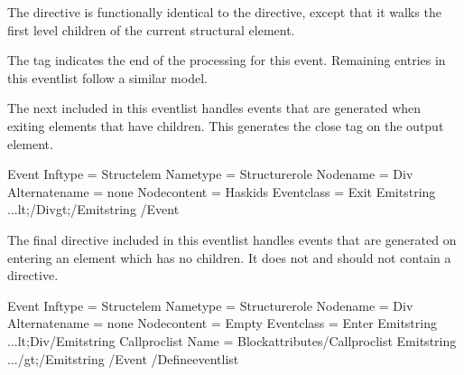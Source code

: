 \documentclass[letterpaper,12pt,english,openany,oneside]{sphinxmanual}
\begin{document}
The  directive is functionally identical to the  directive, except that it walks the first level children of the current structural element.

The  tag indicates the end of the processing for this event. Remaining entries in this event\sphinxhyphen{}list follow a similar model.

The next  included in this event\sphinxhyphen{}list handles events that are generated when exiting  elements that have children. This generates the close tag on the output element.

\begin{sphinxVerbatim}[commandchars=\\\{\}]
\PYGZlt{}Event Inf\PYGZhy{}type = \PYGZdq{}Struct\PYGZhy{}elem\PYGZdq{} Name\PYGZhy{}type = \PYGZdq{}Structure\PYGZhy{}role\PYGZdq{}
              Node\PYGZhy{}name = \PYGZdq{}Div\PYGZdq{} Alternate\PYGZhy{}name = \PYGZdq{}\PYGZhy{}none\PYGZhy{}\PYGZdq{}
              Node\PYGZhy{}content = \PYGZdq{}Has\PYGZhy{}kids\PYGZdq{} Event\PYGZhy{}class = \PYGZdq{}Exit\PYGZdq{}\PYGZgt{}
      \PYGZlt{}Emit\PYGZhy{}string ...\PYGZgt{}\PYGZam{}lt;/Div\PYGZam{}gt;\PYGZlt{}/Emit\PYGZhy{}string\PYGZgt{}
\PYGZlt{}/Event\PYGZgt{}
\end{sphinxVerbatim}

The final  directive included in this event\sphinxhyphen{}list handles events that are generated on entering an element which has no children. It does not and should not contain a  directive.

\begin{sphinxVerbatim}[commandchars=\\\{\}]
  \PYGZlt{}Event Inf\PYGZhy{}type = \PYGZdq{}Struct\PYGZhy{}elem\PYGZdq{} Name\PYGZhy{}type = \PYGZdq{}Structure\PYGZhy{}role\PYGZdq{}
                Node\PYGZhy{}name = \PYGZdq{}Div\PYGZdq{} Alternate\PYGZhy{}name = \PYGZdq{}\PYGZhy{}none\PYGZhy{}\PYGZdq{}
                Node\PYGZhy{}content = \PYGZdq{}Empty\PYGZdq{} Event\PYGZhy{}class = \PYGZdq{}Enter\PYGZdq{}\PYGZgt{}
          \PYGZlt{}Emit\PYGZhy{}string ...\PYGZgt{}\PYGZam{}lt;Div\PYGZlt{}/Emit\PYGZhy{}string\PYGZgt{}
          \PYGZlt{}Call\PYGZhy{}proc\PYGZhy{}list Name = \PYGZdq{}Block\PYGZhy{}attributes\PYGZdq{}\PYGZgt{}\PYGZlt{}/Call\PYGZhy{}proc\PYGZhy{}list\PYGZgt{}
          \PYGZlt{}Emit\PYGZhy{}string ...\PYGZgt{}/\PYGZam{}gt;\PYGZlt{}/Emit\PYGZhy{}string\PYGZgt{}
  \PYGZlt{}/Event\PYGZgt{}
\PYGZlt{}/Define\PYGZhy{}event\PYGZhy{}list\PYGZgt{}
\end{sphinxVerbatim}
\end{document}

